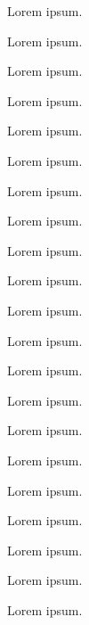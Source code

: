 Lorem ipsum.


Lorem ipsum.


Lorem ipsum.


Lorem ipsum.


Lorem ipsum.


Lorem ipsum.


Lorem ipsum.


Lorem ipsum.


Lorem ipsum.


Lorem ipsum.


Lorem ipsum.


Lorem ipsum.


Lorem ipsum.


Lorem ipsum.


Lorem ipsum.


Lorem ipsum.


Lorem ipsum.


Lorem ipsum.


Lorem ipsum.


Lorem ipsum.


Lorem ipsum.

